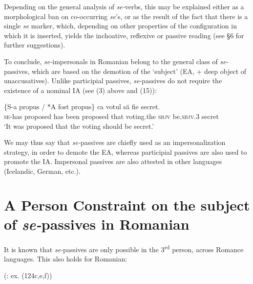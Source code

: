 \documentclass[output=paper]{langsci/langscibook}
\begin{document}
Depending on the general analysis of \textit{se-}verbs, this may be explained either as a morphological ban on co-occurring \textit{se}’s, or as the result of the fact that there is a single \textit{se} marker, which, depending on other properties of the configuration in which it is inserted, yields the inchoative, reflexive or passive reading (see §6 for further suggestions).

  To conclude, \textit{se-}impersonals in Romanian belong to the general class of \textit{se-}passives, which are based on the demotion of the ‘subject' (EA, + deep object of unaccusatives). Unlike participial passives, \textit{se}{}-passives do not require the existence of a nominal IA (see (3) above and (15)):

\ea%
    \label{ex:giurgea:15}
    \gll \{S-a      propus    / *A   fost   propus\}   ca   votul          să     fie           secret.\\
         \textsc{se-}has proposed {}   has been proposed that voting.the \textsc{sbjv} be.\textsc{sbjv.3} secret\\
    \glt ‘It was proposed that the voting should be secret.’
    \z

          

We may thus say that \textit{se-}passives are chiefly used as an impersonalization strategy, in order to demote the EA, whereas participial passives are also used to promote the IA. Impersonal passives are also attested in other languages (Icelandic, German, etc.).

\section{A Person Constraint on the subject of \textit{se-}passives in Romanian}%

It is known that \textit{se-}passives are only possible in the 3\textsuperscript{rd} person, across Romance languages. This also holds for Romanian:

\ea%
    (\citealt{Dobrovie-Sorin2017}: ex. (124c,e,f))\label{ex:giurgea:16}\\
    \z
\z
\end{document}
